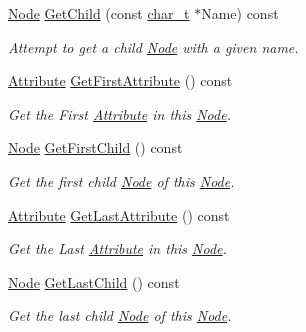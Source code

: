 \begin{DoxyCompactItemize}
\hyperlink{classphys_1_1xml_1_1Node}{Node} \hyperlink{classphys_1_1xml_1_1Node_a4d3f74c2c2613c84376b1ab6f3ed19c9}{GetChild} (const \hyperlink{namespacephys_1_1xml_afc87705cd1c2917d87b879715a2d8f6e}{char\_\-t} $\ast$Name) const 
\begin{DoxyCompactList}\small\item\em Attempt to get a child \hyperlink{classphys_1_1xml_1_1Node}{Node} with a given name. \item\end{DoxyCompactList}\item 
\hyperlink{classphys_1_1xml_1_1Attribute}{Attribute} \hyperlink{classphys_1_1xml_1_1Node_ae484caac4f1fb2a4b7767ddfed28bf0c}{GetFirstAttribute} () const 
\begin{DoxyCompactList}\small\item\em Get the First \hyperlink{classphys_1_1xml_1_1Attribute}{Attribute} in this \hyperlink{classphys_1_1xml_1_1Node}{Node}. \item\end{DoxyCompactList}\item 
\hyperlink{classphys_1_1xml_1_1Node}{Node} \hyperlink{classphys_1_1xml_1_1Node_a70a568eff666114c28cba812ff202cb6}{GetFirstChild} () const 
\begin{DoxyCompactList}\small\item\em Get the first child \hyperlink{classphys_1_1xml_1_1Node}{Node} of this \hyperlink{classphys_1_1xml_1_1Node}{Node}. \item\end{DoxyCompactList}\item 
\hyperlink{classphys_1_1xml_1_1Attribute}{Attribute} \hyperlink{classphys_1_1xml_1_1Node_a9c5ff28c5d1a04ca38da1d7df118ed5f}{GetLastAttribute} () const 
\begin{DoxyCompactList}\small\item\em Get the Last \hyperlink{classphys_1_1xml_1_1Attribute}{Attribute} in this \hyperlink{classphys_1_1xml_1_1Node}{Node}. \item\end{DoxyCompactList}\item 
\hyperlink{classphys_1_1xml_1_1Node}{Node} \hyperlink{classphys_1_1xml_1_1Node_a10f1a568c8c2c691126f1a9ed2afb922}{GetLastChild} () const 
\begin{DoxyCompactList}\small\item\em Get the last child \hyperlink{classphys_1_1xml_1_1Node}{Node} of this \hyperlink{classphys_1_1xml_1_1Node}{Node}. \item\end{DoxyCompactList}\item 

\end{DoxyCompactItemize}
